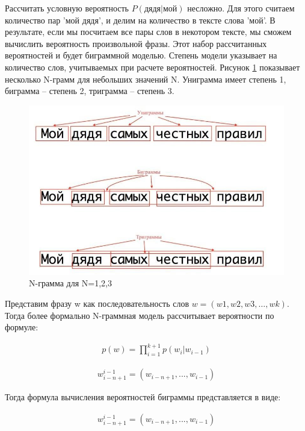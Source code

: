 Рассчитать условную вероятность $P(дядя|мой)$ несложно. Для этого считаем количество пар 'мой дядя', и делим на количество в тексте слова 'мой'. 
В результате, если мы посчитаем все пары слов в некотором тексте, мы сможем вычислить вероятность произвольной фразы. 
Этот набор рассчитанных вероятностей и будет биграммной моделью. Степень модели указывает на количество слов, учитываемых при расчете вероятностей. 
Рисунок \ref{pic:speach_2} показывает несколько N-грамм для небольших значений N. Униграмма имеет степень 1, биграмма – степень 2, триграмма – степень 3.

\begin{figure}[h]
\includegraphics[width=0.75\columnwidth]{./img/speach_2.jpg}
\centering
\caption{N-грамма для N=1,2,3}
\label{pic:speach_2}
\end{figure}  

Представим фразу w как последовательность слов $w = (w1,w2,w3,…,wk)$. 
Тогда более формально N-граммная модель рассчитывает вероятности по формуле:

\begin{equation}
  \begin{gathered}
    p(w) = \prod_{i=1}^{k+1}p(w_{i}|w_{i-1})
  \end{gathered}
  \label{eq:speach_formula_3}
\end{equation}

\begin{equation}
  \begin{gathered}
    w_{i-n+1}^{i-1} = (w_{i-n+1}, ..., w_{i-1})
  \end{gathered}
  \label{eq:speach_formula_4}
\end{equation}

Тогда формула вычисления вероятностей биграммы представляется в виде:

\begin{equation}
  \begin{gathered}
    w_{i-n+1}^{i-1} = (w_{i-n+1}, ..., w_{i-1})
  \end{gathered}
  \label{eq:speach_formula_5}
\end{equation}

